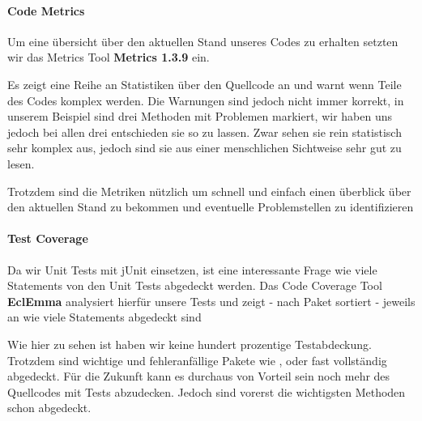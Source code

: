 \paragraph{Code Metrics}

Um eine übersicht über den aktuellen Stand unseres Codes zu erhalten setzten wir das Metrics Tool \textbf{Metrics 1.3.9} ein. 


Es zeigt eine Reihe an Statistiken über den Quellcode an und warnt wenn Teile des Codes komplex werden. 
Die Warnungen sind jedoch nicht immer korrekt, in unserem Beispiel sind drei Methoden mit Problemen markiert, wir haben uns jedoch bei allen drei entschieden sie so zu lassen. Zwar sehen sie rein statistisch sehr komplex aus, jedoch sind sie aus einer menschlichen Sichtweise sehr gut zu lesen.

Trotzdem sind die Metriken nützlich um schnell und einfach einen überblick über den aktuellen Stand zu bekommen und eventuelle Problemstellen zu identifizieren

\paragraph{Test Coverage}

Da wir Unit Tests mit jUnit einsetzen, ist eine interessante Frage wie viele Statements von den Unit Tests abgedeckt werden.
Das Code Coverage Tool \textbf{EclEmma} analysiert hierfür unsere Tests und zeigt - nach Paket sortiert - jeweils an wie viele Statements abgedeckt sind


Wie hier zu sehen ist haben wir keine hundert prozentige Testabdeckung. Trotzdem sind wichtige und fehleranfällige Pakete wie ,  oder  fast vollständig abgedeckt.
Für die Zukunft kann es durchaus von Vorteil sein noch mehr des Quellcodes mit Tests abzudecken. Jedoch sind vorerst die wichtigsten Methoden schon abgedeckt.